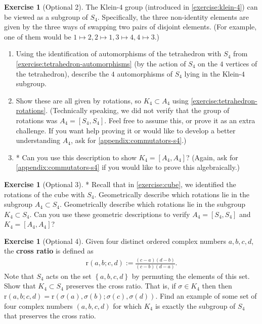 \documentclass[reqno, 12pt, letter]{article}
\theoremstyle{plain}
\theoremstyle{definition}
\newtheorem{exercise}[theorem]{Exercise}
\theoremstyle{remark}
\numberwithin{equation}{section}
\begin{document}
\begin{exercise}[Optional 2]
	\label{exercise:}
	The Klein-$4$ group (introduced in \autoref{exercise:klein-4})
	can be viewed as a subgroup of $S_4$. Specifically, the three non-identity elements are
	given by the three ways of swapping two pairs of disjoint elements. (For example, one of them would be $1 \mapsto 2, 2 \mapsto 1, 3\mapsto 4, 4 \mapsto 3$.)
	\begin{enumerate}
		\item Using the identification of automorphisms of the tetrahedron with $S_4$ from \autoref{exercise:tetrahedron-automorphisms}
		      (by the action of
		      $S_4$ on the $4$ vertices of the tetrahedron),
		      describe the $4$ automorphisms of $S_4$ lying in the Klein-$4$ subgroup.
		\item Show these are all given by rotations, so $K_4 \subset A_4$ using \autoref{exercise:tetrahedron-rotations}. (Technically speaking, we did
		      not verify that the group of rotations was $A_4 = \left[ S_4, S_4 \right]$. Feel free to assume this, or prove it as an extra challenge.
		      If you want help proving it or would like to develop a better understanding $A_4$, ask for \autoref{appendix:commutators-s4}.)
		\item* 	Can you use this description to show $K_4 = \left[ A_4, A_4 \right]$? (Again, ask for \autoref{appendix:commutators-s4} if you would like to
		      prove this algebraically.)
	\end{enumerate}
\end{exercise}

\begin{exercise}[Optional 3]*
	\label{exercise:}
	Recall that in \autoref{exercise:cube}, we identified the rotations of the cube with $S_4$.
	Geometrically describe which rotations lie in the subgroup $A_4 \subset S_4$.
	Geometrically describe which rotations lie in the subgroup $K_4 \subset S_4$.
	Can you use these geometric descriptions to verify $A_4 = \left[ S_4, S_4 \right]$ and $K_4 = \left[ A_4, A_4 \right]$?
\end{exercise}
\begin{exercise}[Optional 4]
	\label{exercise:cross-ratio}
	Given four distinct ordered complex numbers $a,b,c,d$, the {\bf cross ratio} is defined as
	\begin{align*}
		\mathrm{r}(a,b;c,d) := \frac{(c-a)(d-b)}{(c-b)(d-a)}.
	\end{align*}
	Note that $S_4$ acts on the set $\left\{ a,b,c,d \right\}$ by permuting the elements of this set. Show that $K_4 \subset S_4$ preserves the cross ratio.
	That is, if $\sigma \in K_4$ then then $\mathrm{r}(a,b;c,d) = \mathrm{r}(\sigma(a),\sigma(b);\sigma(c),\sigma(d))$.
	Find an example of some set of four complex numbers $(a,b,c,d)$ for which $K_4$ is exactly the subgroup of $S_4$ that preserves
	the cross ratio.
\end{exercise}
\end{document}
